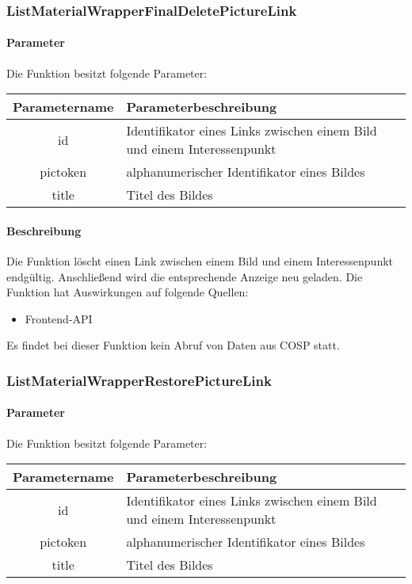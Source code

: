 \subsubsection{ListMaterialWrapperFinalDeletePictureLink}
\paragraph{Parameter} Die Funktion besitzt folgende Parameter:
\begin{table}[H]
	\begin{tabular}{|c|p{11cm}|}
		\hline
		\textbf{Parametername} & \textbf{Parameterbeschreibung} \\ \hline
		id       & Identifikator eines Links zwischen einem Bild und einem Interessenpunkt \\ \hline
		pictoken & alphanumerischer Identifikator eines Bildes \\ \hline
		title    & Titel des Bildes \\ \hline
	\end{tabular}
\end{table}
\paragraph{Beschreibung} Die Funktion löscht einen Link zwischen einem Bild und einem Interessenpunkt endgültig. Anschließend wird die entsprechende Anzeige neu geladen. Die Funktion hat Auswirkungen auf folgende Quellen:
\begin{itemize}
	\item Frontend-API
\end{itemize}
Es findet bei dieser Funktion kein Abruf von Daten aus {\glqq COSP\grqq} statt.
\subsubsection{ListMaterialWrapperRestorePictureLink}
\paragraph{Parameter} Die Funktion besitzt folgende Parameter:
\begin{table}[H]
	\begin{tabular}{|c|p{11cm}|}
		\hline
		\textbf{Parametername} & \textbf{Parameterbeschreibung} \\ \hline
		id       & Identifikator eines Links zwischen einem Bild und einem Interessenpunkt \\ \hline
		pictoken & alphanumerischer Identifikator eines Bildes \\ \hline
		title    & Titel des Bildes \\ \hline
	\end{tabular}
\end{table}
